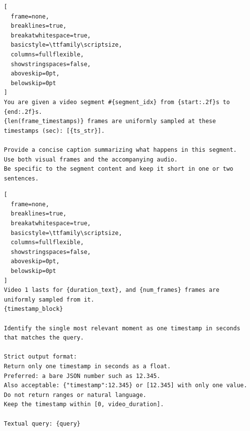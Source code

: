 \begin{tcolorbox}[
  colback=blue!3!white,
  colframe=blue!70!black,
  width=\linewidth,
  arc=1mm,
  boxrule=0.45pt,
  boxsep=0.8mm,
  left=1.6mm,
  right=1.6mm,
  top=1.2mm,
  bottom=1.2mm,
  title=\textbf{Segment Captioning Prompt},
  colbacktitle=blue!70!black,
  coltitle=white,
  fonttitle=\scriptsize\bfseries\sffamily,
  halign title=center
]
\setlength{\parindent}{0pt}
\begin{lstlisting}[
  frame=none,
  breaklines=true,
  breakatwhitespace=true,
  basicstyle=\ttfamily\scriptsize,
  columns=fullflexible,
  showstringspaces=false,
  aboveskip=0pt,
  belowskip=0pt
]
You are given a video segment #{segment_idx} from {start:.2f}s to {end:.2f}s.
{len(frame_timestamps)} frames are uniformly sampled at these timestamps (sec): [{ts_str}].

Provide a concise caption summarizing what happens in this segment.
Use both visual frames and the accompanying audio.
Be specific to the segment content and keep it short in one or two sentences.
\end{lstlisting}
\end{tcolorbox}

\begin{tcolorbox}[
  colback=blue!3!white,
  colframe=blue!70!black,
  width=\linewidth,
  arc=1mm,
  boxrule=0.45pt,
  boxsep=0.8mm,
  left=1.6mm,
  right=1.6mm,
  top=1.2mm,
  bottom=1.2mm,
  title=\textbf{Timestamp Prediction Prompt},
  colbacktitle=blue!70!black,
  coltitle=white,
  fonttitle=\scriptsize\bfseries\sffamily,
  halign title=center
]
\setlength{\parindent}{0pt}
\begin{lstlisting}[
  frame=none,
  breaklines=true,
  breakatwhitespace=true,
  basicstyle=\ttfamily\scriptsize,
  columns=fullflexible,
  showstringspaces=false,
  aboveskip=0pt,
  belowskip=0pt
]
Video 1 lasts for {duration_text}, and {num_frames} frames are uniformly sampled from it.
{timestamp_block}

Identify the single most relevant moment as one timestamp in seconds that matches the query.

Strict output format:
Return only one timestamp in seconds as a float.
Preferred: a bare JSON number such as 12.345.
Also acceptable: {"timestamp":12.345} or [12.345] with only one value.
Do not return ranges or natural language.
Keep the timestamp within [0, video_duration].

Textual query: {query}
\end{lstlisting}
\end{tcolorbox}
